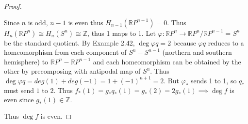 \documentclass{article}
\newcommand{\R}{\mathbb{R}}
\newcommand{\RP}{\mathbb{R} P}
\newcommand{\Z}{\mathbb{Z}}
\begin{document}
\begin{proof}
\begin{enumerate}
    Since $n$ is odd, $n - 1$ is even thus $H_{n - 1}(\R P^{n - 1}) = 0$. Thus $H_n(\R P^n) \cong H_n(S^n) \cong \Z$, thus 1 maps to 1. Let $\varphi: \R P^{n} \to \R P^{n} / \R P^{n - 1} = S^n$ be the standard quotient. By Example 2.42, $\deg \varphi q = 2$ because $\varphi q$ reduces to a homeomorphism from each component of $S^n - S^{n - 1}$ (northern and southern hemisphere) to $\RP^{n} - \RP^{n - 1}$ and each homeomorphism can be obtained by the other by precomposing with antipodal map of $S^n$. Thus $\deg \varphi q = deg (1) + deg (-1) = 1 + (-1)^{n + 1} = 2$. But $\varphi_{*}$ sends 1 to 1, so $q_*$ must send $1$ to $2$. Thus $f_*(1) = g_*q_*(1) = g_*(2) = 2 g_*(1) \implies \deg f$ is even since $g_*(1) \in \Z$. 
\end{enumerate}

Thus $\deg f$ is even.  

\end{proof}
\end{document}
